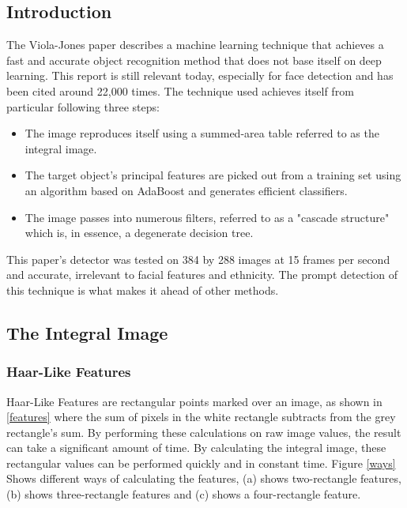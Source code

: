     \subsection{Introduction}
    The Viola-Jones paper \cite{990517} describes a machine learning
    technique that achieves a fast and accurate object recognition
    method that does not base itself on deep learning. This report
    is still relevant today, especially for face detection and has
    been cited around 22,000 times. The technique used achieves
    itself from particular following three steps:
        \begin{itemize}
            \item The image reproduces itself using a summed-area
            table referred to as the integral image.

            \item The target object's principal features are picked
            out from a training set using an algorithm based on
            AdaBoost and generates efficient classifiers.
            
            \item The image passes into numerous filters, referred to
            as a "cascade structure" which is, in essence, a
            degenerate decision tree.  

        \end{itemize}

    This paper's detector was tested on 384 by 288 images at 15
    frames per second and accurate, irrelevant to facial features
    and ethnicity. The prompt detection of this technique is what
    makes it ahead of other methods.

    \subsection{The Integral Image}

        \subsubsection{Haar-Like Features}
        Haar-Like Features are rectangular points marked over an
        image, as shown in \ref{features} where the sum of pixels in
        the white rectangle subtracts from the grey rectangle's sum.
        By performing these calculations on raw image values, the
        result can take a significant amount of time. By calculating
        the integral image, these rectangular values can be performed
        quickly and in constant time. Figure \ref{ways} Shows
        different ways of calculating the features, (a) shows
        two-rectangle features, (b) shows three-rectangle features and
        (c) shows a four-rectangle feature.


